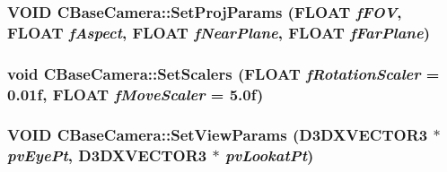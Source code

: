 \label{class_c_base_camera_a7cda8d85d13b016697b4c4e27d57e41c}
\hypertarget{class_c_base_camera_a08cfa8a4246cd6115e6522821e573e89}{
\subsubsection[{SetProjParams}]{\setlength{\rightskip}{0pt plus 5cm}VOID CBaseCamera::SetProjParams (FLOAT {\em fFOV}, \/  FLOAT {\em fAspect}, \/  FLOAT {\em fNearPlane}, \/  FLOAT {\em fFarPlane})}}
\label{class_c_base_camera_a08cfa8a4246cd6115e6522821e573e89}
\hypertarget{class_c_base_camera_a33c8df00f0f8d644744621ac7142d5f8}{
\subsubsection[{SetScalers}]{\setlength{\rightskip}{0pt plus 5cm}void CBaseCamera::SetScalers (FLOAT {\em fRotationScaler} = {\ttfamily 0.01f}, \/  FLOAT {\em fMoveScaler} = {\ttfamily 5.0f})}}
\label{class_c_base_camera_a33c8df00f0f8d644744621ac7142d5f8}
\hypertarget{class_c_base_camera_a17b45dd3b6055bc761058d57f5a10c02}{
\subsubsection[{SetViewParams}]{\setlength{\rightskip}{0pt plus 5cm}VOID CBaseCamera::SetViewParams (D3DXVECTOR3 $\ast$ {\em pvEyePt}, \/  D3DXVECTOR3 $\ast$ {\em pvLookatPt})}}
\label{class_c_base_camera_a17b45dd3b6055bc761058d57f5a10c02}


